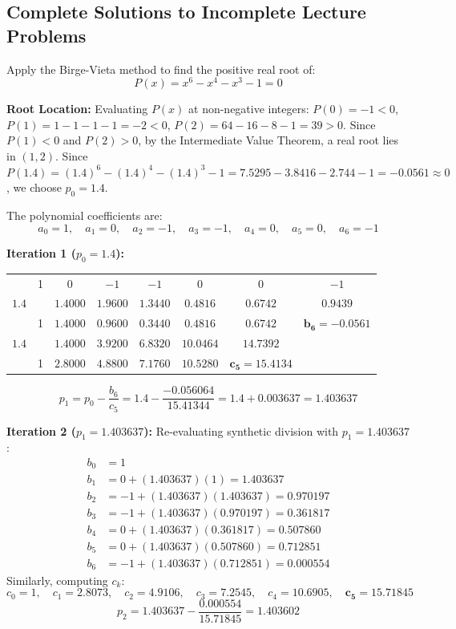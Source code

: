 \documentclass[11pt,a4paper]{article}
\begin{document}
\subsection{Complete Solutions to Incomplete Lecture Problems}

\begin{exambox}
Apply the Birge-Vieta method to find the positive real root of:
$$P(x) = x^6 - x^4 - x^3 - 1 = 0$$
\end{exambox}

\begin{solbox}
\textbf{Root Location:}
Evaluating $P(x)$ at non-negative integers:
$P(0) = -1 < 0$, $P(1) = 1 - 1 - 1 - 1 = -2 < 0$, $P(2) = 64 - 16 - 8 - 1 = 39 > 0$.
Since $P(1) < 0$ and $P(2) > 0$, by the Intermediate Value Theorem, a real root lies in $(1, 2)$. Since $P(1.4) = (1.4)^6 - (1.4)^4 - (1.4)^3 - 1 = 7.5295 - 3.8416 - 2.744 - 1 = -0.0561 \approx 0$, we choose $p_0 = 1.4$.

The polynomial coefficients are:
$$a_0 = 1, \quad a_1 = 0, \quad a_2 = -1, \quad a_3 = -1, \quad a_4 = 0, \quad a_5 = 0, \quad a_6 = -1$$

\textbf{Iteration 1 ($p_0 = 1.4$):}
\begin{center}
\small
\begin{tabular}{c|ccccccc}
    & 1 & 0 & $-1$ & $-1$ & 0 & 0 & $-1$ \\
    $1.4$ & & $1.4000$ & $1.9600$ & $1.3440$ & $0.4816$ & $0.6742$ & $0.9439$ \\
    \hline
    & 1 & $1.4000$ & $0.9600$ & $0.3440$ & $0.4816$ & $0.6742$ & $\mathbf{b_6 = -0.0561}$ \\
    $1.4$ & & $1.4000$ & $3.9200$ & $6.8320$ & $10.0464$ & $14.7392$ & \\
    \hline
    & 1 & $2.8000$ & $4.8800$ & $7.1760$ & $10.5280$ & $\mathbf{c_5 = 15.4134}$ &
\end{tabular}
\end{center}
$$p_1 = p_0 - \frac{b_6}{c_5} = 1.4 - \frac{-0.056064}{15.41344} = 1.4 + 0.003637 = \mathbf{1.403637}$$

\textbf{Iteration 2 ($p_1 = 1.403637$):}
Re-evaluating synthetic division with $p_1 = 1.403637$:
\begin{align*}
    b_0 &= 1 \\
    b_1 &= 0 + (1.403637)(1) = 1.403637 \\
    b_2 &= -1 + (1.403637)(1.403637) = 0.970197 \\
    b_3 &= -1 + (1.403637)(0.970197) = 0.361817 \\
    b_4 &= 0 + (1.403637)(0.361817) = 0.507860 \\
    b_5 &= 0 + (1.403637)(0.507860) = 0.712851 \\
    b_6 &= -1 + (1.403637)(0.712851) = \mathbf{0.000554}
\end{align*}
Similarly, computing $c_k$:
$$c_0 = 1, \quad c_1 = 2.8073, \quad c_2 = 4.9106, \quad c_3 = 7.2545, \quad c_4 = 10.6905, \quad \mathbf{c_5 = 15.71845}$$
$$p_2 = 1.403637 - \frac{0.000554}{15.71845} = \mathbf{1.403602}$$


\end{solbox}
\end{document}
